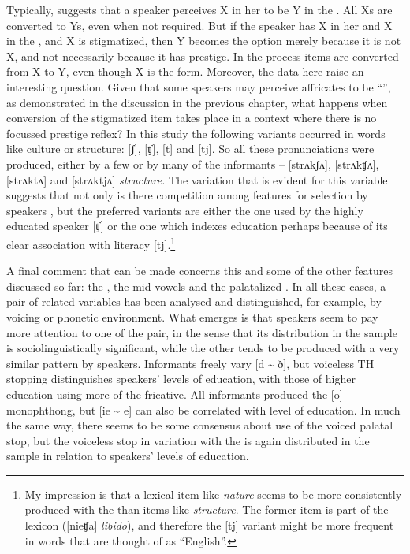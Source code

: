   Typically,  suggests that a speaker perceives X in her  to be Y in the .  All Xs are converted to Ys, even when not required.  But if the speaker has X in her  and X in the , and X is stigmatized, then Y becomes the option merely because it is not X, and not necessarily because it has prestige.  In the process items are converted from X to Y, even though X is the  form.  Moreover, the data here raise an interesting question.  Given that some speakers may perceive affricates to be “”, as demonstrated in the discussion in the previous chapter, what happens when conversion of the stigmatized item takes place in a context where there is no focussed prestige reflex?  In this study the following variants occurred in words like culture or structure: [ʃ], [ʧ], [t] and [tj].  So all these pronunciations were produced, either by a few or by many of the informants – [strʌkʃʌ], [strʌkʧʌ], [strʌktʌ] and [strʌktjʌ] \textit{structure.}  The variation that is evident for this variable suggests that not only is there competition among features for selection by speakers \citep[143]{Mufwene2001}, but the preferred variants are either the one used by the highly educated speaker [ʧ] or the one which indexes education perhaps because of its clear association with literacy [tj].\footnote{My impression is that a lexical item like \textit{nature} seems to be more consistently produced with the  than items like \textit{structure}.  The former item is part of the  lexicon ([nieʧa] \textit{libido}), and therefore the [tj] variant might be more frequent in words that are thought of as “English”.} 

  A final comment that can be made concerns this and some of the other features discussed so far: the , the mid-vowels and the palatalized .  In all these cases, a pair of related variables has been analysed and distinguished, for example, by voicing or phonetic environment.  What emerges is that speakers seem to pay more attention to one of the pair, in the sense that its distribution in the sample is sociolinguistically significant, while the other tends to be produced with a very similar pattern by speakers.  Informants freely vary [d {\textasciitilde} ð], but voiceless TH stopping distinguishes speakers’ levels of education, with those of higher education using more of the fricative.  All informants produced the [o] monophthong, but [ie {\textasciitilde} e] can also be correlated with level of education.  In much the same way, there seems to be some consensus about use of the voiced palatal stop, but the voiceless stop in variation with the  is again distributed in the sample in relation to speakers’ levels of education.

